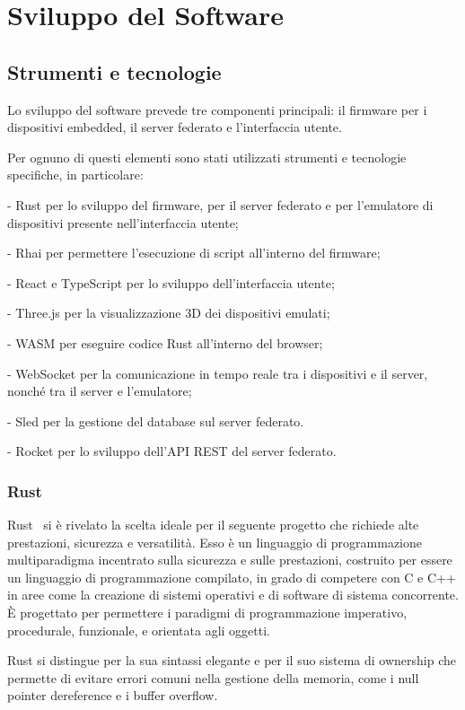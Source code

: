 \chapter{Sviluppo del Software}

\section{Strumenti e tecnologie}

Lo sviluppo del software prevede tre componenti principali: il firmware per i dispositivi
embedded, il server federato e l'interfaccia utente.

Per ognuno di questi elementi sono stati utilizzati strumenti e tecnologie specifiche, in particolare: 

- Rust per lo sviluppo del firmware, per il server federato e per l'emulatore di dispositivi presente nell'interfaccia utente;

- Rhai per permettere l'esecuzione di script all'interno del firmware;

- React e TypeScript per lo sviluppo dell'interfaccia utente;

- Three.js per la visualizzazione 3D dei dispositivi emulati;

- WASM per eseguire codice Rust all'interno del browser;

- WebSocket per la comunicazione in tempo reale tra i dispositivi e il server, nonché tra il server e l'emulatore;

- Sled per la gestione del database sul server federato.

- Rocket per lo sviluppo dell'API REST del server federato.

\subsection{Rust}

Rust~\cite{rust_website} si è rivelato la scelta ideale per il seguente progetto che richiede alte prestazioni, sicurezza e versatilità.
Esso è un linguaggio di programmazione multiparadigma incentrato sulla sicurezza e sulle prestazioni, 
costruito per essere un linguaggio di programmazione compilato, in grado di competere con C 
e C++ in aree come la creazione di sistemi operativi e di software di sistema concorrente. 
È progettato per permettere i paradigmi di programmazione imperativo, procedurale, funzionale, 
e orientata agli oggetti.

Rust si distingue per la sua sintassi elegante e per il suo sistema di ownership che permette di evitare
errori comuni nella gestione della memoria, come i null pointer dereference e i buffer overflow.

